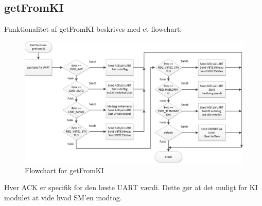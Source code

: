 \subsection{getFromKI}
Funktionalitet af getFromKI beskrives med et flowchart:
\begin{figure}[H]
\centering
\includegraphics[width=1\textwidth]{billeder/getFromKIflowchart}
\caption{Flowchart for getFromKI}
\label{getFromKIFC}
\end{figure}
Hver ACK er specifik for den læste UART værdi. Dette gør at det muligt for KI modulet at vide hvad SM'en modtog. 